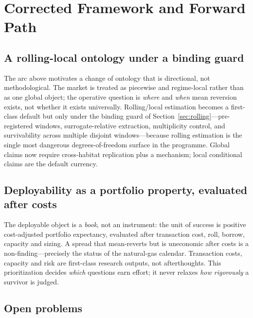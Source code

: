 \documentclass[11pt,a4paper]{article}
\begin{document}
\section{Corrected Framework and Forward Path}
\label{sec:forward}

\subsection{A rolling-local ontology under a binding guard}

The arc above motivates a change of ontology that is directional, not methodological. The market is
treated as piecewise and regime-local rather than as one global object; the operative question is
\emph{where} and \emph{when} mean reversion exists, not whether it exists universally. Rolling/local
estimation becomes a first-class default but only under the binding guard of
Section~\ref{sec:rolling}---pre-registered windows, surrogate-relative extraction, multiplicity
control, and survivability across multiple disjoint windows---because rolling estimation is the single
most dangerous degrees-of-freedom surface in the programme. Global claims now require cross-habitat
replication plus a mechanism; local conditional claims are the default currency.

\subsection{Deployability as a portfolio property, evaluated after costs}

The deployable object is a \emph{book}, not an instrument: the unit of success is positive
cost-adjusted portfolio expectancy, evaluated after transaction cost, roll, borrow, capacity and
sizing. A spread that mean-reverts but is uneconomic after costs is a non-finding---precisely the
status of the natural-gas calendar. Transaction costs, capacity and risk are first-class research
outputs, not afterthoughts. This prioritization decides \emph{which} questions earn effort; it never
relaxes \emph{how rigorously} a survivor is judged.

\subsection{Open problems}
\end{document}
